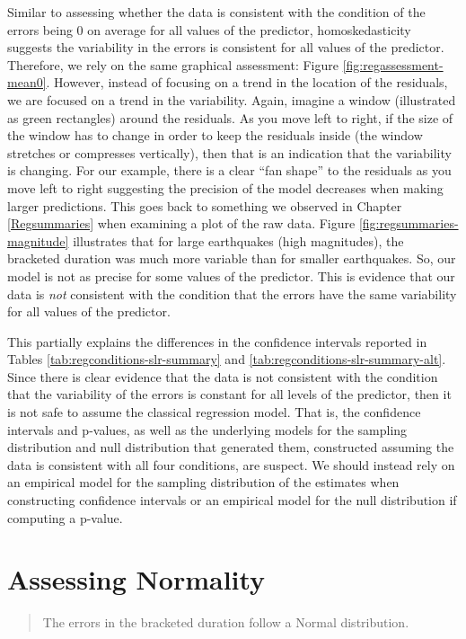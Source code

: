 \documentclass[]{book}
\theoremstyle{plain}
\theoremstyle{mydefn}
\theoremstyle{myexmpl}
\theoremstyle{remark}
\begin{document}
Similar to assessing whether the data is consistent with the condition
of the errors being 0 on average for all values of the predictor,
homoskedasticity suggests the variability in the errors is consistent
for all values of the predictor. Therefore, we rely on the same
graphical assessment: Figure \ref{fig:regassessment-mean0}. However,
instead of focusing on a trend in the location of the residuals, we are
focused on a trend in the variability. Again, imagine a window
(illustrated as green rectangles) around the residuals. As you move left
to right, if the size of the window has to change in order to keep the
residuals inside (the window stretches or compresses vertically), then
that is an indication that the variability is changing. For our example,
there is a clear ``fan shape'' to the residuals as you move left to
right suggesting the precision of the model decreases when making larger
predictions. This goes back to something we observed in Chapter
\ref{Regsummaries} when examining a plot of the raw data. Figure
\ref{fig:regsummaries-magnitude} illustrates that for large earthquakes
(high magnitudes), the bracketed duration was much more variable than
for smaller earthquakes. So, our model is not as precise for some values
of the predictor. This is evidence that our data is \emph{not}
consistent with the condition that the errors have the same variability
for all values of the predictor.

This partially explains the differences in the confidence intervals
reported in Tables \ref{tab:regconditions-slr-summary} and
\ref{tab:regconditions-slr-summary-alt}. Since there is clear evidence
that the data is not consistent with the condition that the variability
of the errors is constant for all levels of the predictor, then it is
not safe to assume the classical regression model. That is, the
confidence intervals and p-values, as well as the underlying models for
the sampling distribution and null distribution that generated them,
constructed assuming the data is consistent with all four conditions,
are suspect. We should instead rely on an empirical model for the
sampling distribution of the estimates when constructing confidence
intervals or an empirical model for the null distribution if computing a
p-value.

\section{Assessing Normality}\label{assessing-normality}

\begin{quote}
The errors in the bracketed duration follow a Normal distribution.
\end{quote}
\end{document}
